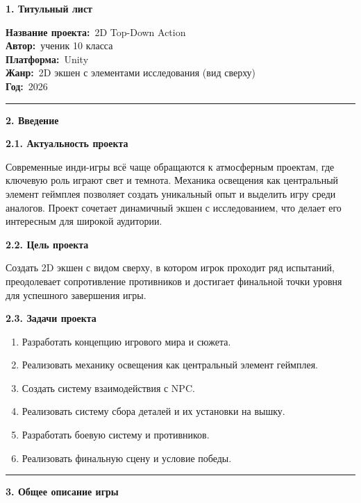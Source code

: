 \documentclass[
]{article}
\begin{document}
\textbf{1. Титульный лист}

\textbf{Название проекта:}~2D Top-Down Action\\
\textbf{Автор:}~ученик 10 класса\\
\textbf{Платформа:}~Unity\\
\textbf{Жанр:}~2D экшен с элементами исследования (вид сверху)\\
\textbf{Год:}~2026

\begin{center}\rule{0.5\linewidth}{0.5pt}\end{center}

\textbf{2. Введение}

\textbf{2.1. Актуальность проекта}

Современные инди-игры всё чаще обращаются к атмосферным проектам, где
ключевую роль играют свет и темнота. Механика освещения как центральный
элемент геймплея позволяет создать уникальный опыт и выделить игру среди
аналогов. Проект сочетает динамичный экшен с исследованием, что делает
его интересным для широкой аудитории.

\textbf{2.2. Цель проекта}

Создать 2D экшен с видом сверху, в котором игрок проходит ряд испытаний,
преодолевает сопротивление противников и достигает финальной точки
уровня для успешного завершения игры.

\textbf{2.3. Задачи проекта}

\begin{enumerate}
\def\labelenumi{\arabic{enumi}.}
\item
  Разработать концепцию игрового мира и сюжета.
\item
  Реализовать механику освещения как центральный элемент геймплея.
\item
  Создать систему взаимодействия с NPC.
\item
  Реализовать систему сбора деталей и их установки на вышку.
\item
  Разработать боевую систему и противников.
\item
  Реализовать финальную сцену и условие победы.
\end{enumerate}

\begin{center}\rule{0.5\linewidth}{0.5pt}\end{center}

\textbf{3. Общее описание игры}
\end{document}
